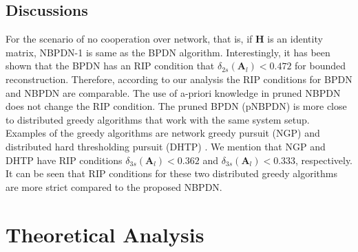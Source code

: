 \documentclass[journal]{IEEEtran}
\newcommand{\mbA}{\mathbf{A}}
\newcommand{\mbH}{\mathbf{H}}
\begin{document}
\subsection{Discussions}
For the scenario of no cooperation over network, that is, if $\mbH$ is an identity matrix, NBPDN-1 is same as the BPDN algorithm. Interestingly, it has been shown that the BPDN has an RIP condition that $\delta_{2s}(\mbA_l) < 0.472$ \cite{Cai_Shifting_Inequality_TSP_2010} for bounded reconstruction. Therefore, according to our analysis the RIP conditions for BPDN and NBPDN are comparable. The use of a-priori knowledge in pruned NBPDN does not change the RIP condition. The pruned BPDN (pNBPDN) is more close to distributed greedy algorithms that work with the same system setup. Examples of the greedy algorithms are network greedy pursuit (NGP) \cite{Zaki_Venkitaraman_Chatterjee_Rasmussen_GreedySparseLearningOverNetwork_TSIPN_2017} and distributed hard thresholding pursuit (DHTP) \cite{Zaki_DHTP_2017}. We mention that NGP and DHTP have RIP conditions $\delta_{3s}(\mbA_l) < 0.362$ and $\delta_{3s}(\mbA_l) < 0.333$, respectively. It can be seen that RIP conditions for these two distributed greedy algorithms are more strict compared to the proposed NBPDN.



\section{Theoretical Analysis}
\label{sec:Theoretical_analysis}
\end{document}
